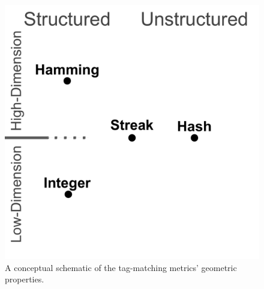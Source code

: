 \begin{figure}
\begin{center}

\includegraphics[width=0.5\columnwidth]{img/conceptual-geometry}
\caption{
A conceptual schematic of the tag-matching metrics' geometric properties.
}
\label{fig:conceptual_geometry}

\end{center}
\end{figure}
